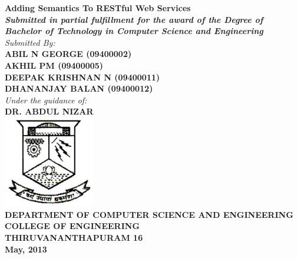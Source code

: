 \begin{titlepage}
\begin{center}
{\huge {\bf Adding Semantics To RESTful Web Services}}\\
\vspace{10mm}
{\it \textbf{Submitted in partial fulfillment for the award of the Degree of Bachelor of Technology in Computer Science and Engineering}}\\
\vspace{20mm}
{\it Submitted By:}\\
{\bf ABIL N GEORGE (09400002)}\\
{\bf AKHIL PM (09400005)}\\
{\bf DEEPAK KRISHNAN N (09400011)}\\
{\bf DHANANJAY BALAN (09400012)}\\

\vspace{5mm}
{\it Under the guidance of:}\\
{\bf DR. ABDUL NIZAR}\\
\vspace{30mm}
\includegraphics[width=0.3\textwidth]{images/cet_logo.jpg}\\
\vspace{3mm}
\textsc{\textbf{DEPARTMENT OF COMPUTER SCIENCE AND ENGINEERING}}\\
\vspace{1mm}
\textsc{\textbf {COLLEGE OF ENGINEERING}}\\
\vspace{1mm}
\textsc{\textbf{THIRUVANANTHAPURAM 16}}\\
\vspace{4mm}
\textbf{May, 2013}
\end{center}
\end{titlepage}
